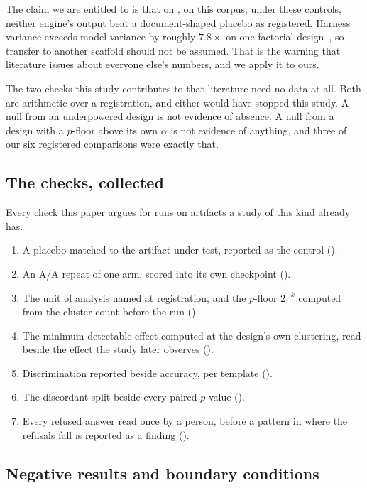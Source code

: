 The claim we are entitled to is that on \NUM{\studyModel}, on this corpus,
under these controls, neither engine's output beat a document-shaped placebo
as registered. Harness variance exceeds model variance
by roughly $7.8\times$ on one factorial design~\citep{harnessdisclosure2026},
so transfer to another scaffold should not be assumed. That is the warning
that literature issues about everyone else's numbers, and we apply it to
ours.

The two checks this study contributes to that literature need no data at
all. Both are arithmetic over a registration, and either would have stopped
this study. A null from an underpowered design is not evidence of absence. A
null from a design with a $p$-floor above its own $\alpha$ is not evidence
of anything, and three of our six registered comparisons were exactly that.

\subsection{The checks, collected}

Every check this paper argues for runs on artifacts a study of this kind
already has.

\begin{enumerate}
  \item A placebo matched to the artifact under test, reported as the
    control ().
  \item An A/A repeat of one arm, scored into its own checkpoint
    ().
  \item The unit of analysis named at registration, and the $p$-floor
    $2^{-k}$ computed from the cluster count before the run
    ().
  \item The minimum detectable effect computed at the design's own
    clustering, read beside the effect the study later observes
    ().
  \item Discrimination reported beside accuracy, per template
    ().
  \item The discordant split beside every paired $p$-value
    ().
  \item Every refused answer read once by a person, before a pattern in
    where the refusals fall is reported as a finding ().
\end{enumerate}

\subsection{Negative results and boundary conditions}

